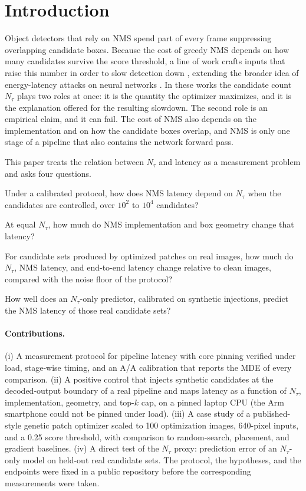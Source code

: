 \documentclass[a4paper,fleqn]{cas-dc}
\newcommand{\Ntau}{N_{\tau}}
\begin{document}
\section{Introduction}
Object detectors that rely on NMS spend part of every frame suppressing overlapping candidate boxes. Because the cost of greedy NMS depends on how many candidates survive the score threshold, a line of work crafts inputs that raise this number in order to slow detection down \cite{phantom2023,overload2024}, extending the broader idea of energy-latency attacks on neural networks \cite{shumailov2021sponge}. In these works the candidate count $\Ntau$ plays two roles at once: it is the quantity the optimizer maximizes, and it is the explanation offered for the resulting slowdown. The second role is an empirical claim, and it can fail. The cost of NMS also depends on the implementation and on how the candidate boxes overlap, and NMS is only one stage of a pipeline that also contains the network forward pass.

This paper treats the relation between $\Ntau$ and latency as a measurement problem and asks four questions.
\begin{description}[leftmargin=2.2em,labelwidth=2em,itemsep=1pt]
\item[Q1] Under a calibrated protocol, how does NMS latency depend on $\Ntau$ when the candidates are controlled, over $10^2$ to $10^4$ candidates?
\item[Q2] At equal $\Ntau$, how much do NMS implementation and box geometry change that latency?
\item[Q3] For candidate sets produced by optimized patches on real images, how much do $\Ntau$, NMS latency, and end-to-end latency change relative to clean images, compared with the noise floor of the protocol?
\item[Q4] How well does an $\Ntau$-only predictor, calibrated on synthetic injections, predict the NMS latency of those real candidate sets?
\end{description}

\paragraph{Contributions.}
(i) A measurement protocol for pipeline latency with core pinning verified under load, stage-wise timing, and an A/A calibration that reports the MDE of every comparison. (ii) A positive control that injects synthetic candidates at the decoded-output boundary of a real pipeline and maps latency as a function of $\Ntau$, implementation, geometry, and top-$k$ cap, on a pinned laptop CPU (the Arm smartphone could not be pinned under load). (iii) A case study of a published-style genetic patch optimizer scaled to 100 optimization images, 640-pixel inputs, and a 0.25 score threshold, with comparison to random-search, placement, and gradient baselines. (iv) A direct test of the $\Ntau$ proxy: prediction error of an $\Ntau$-only model on held-out real candidate sets. The protocol, the hypotheses, and the endpoints were fixed in a public repository before the corresponding measurements were taken.
\end{document}
